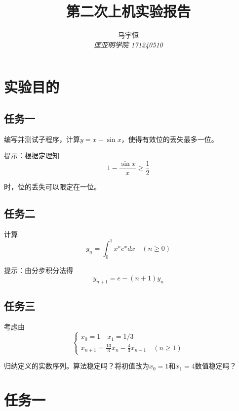 \documentclass[a4paper,11pt,onecolumn,twoside]{article}
\title{\textbf{第二次上机实验报告}}
\author{
马宇恒
\\[2pt]
{\small \textit{匡亚明学院 171240510}}}
\date{}
\begin{document}
\maketitle
\thispagestyle{firststyle}
\setlength{\oddsidemargin}{ 1cm}
\setlength{\evensidemargin}{\oddsidemargin}
\setlength{\textwidth}{15.50cm}
\vspace{-.8cm}


\setcounter{page}{1}

\setlength{\oddsidemargin}{-.5cm}  %
\setlength{\evensidemargin}{\oddsidemargin}
\setlength{\textwidth}{17.00cm}

\section{实验目的}
\subsection{任务一}
编写并测试子程序，计算$y = x - \sin x$，使得有效位的丢失最多一位。\par 提示：根据定理知$$1 - \frac { \sin x } { x } \geq \frac { 1 } { 2 }$$\par 时，位的丢失可以限定在一位。
\subsection{任务二}计算$$y _ { n } = \int _ { 0 } ^ { 1 } x ^ { n } e ^ { x } d x \quad ( n \geq 0 )$$\par 提示：由分步积分法得$$y _ { n + 1 } = e - ( n + 1 ) y _ { n }$$
\subsection{任务三}考虑由$$\left\{ \begin{array} { l } { x _ { 0 } = 1 \quad x _ { 1 } = 1 / 3 } \\ { x _ { n + 1 } = \frac { 13 } { 3 } x _ { n } - \frac { 4 } { 3 } x _ { n - 1 } \quad ( n \geq 1 ) } \end{array} \right.$$\par 归纳定义的实数序列。算法稳定吗？将初值改为$x_{0}=1$和$x_{1}=4$数值稳定吗？

\section{任务一}
\end{document}
